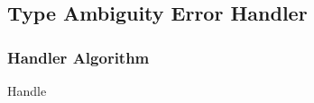 \documentclass[../../Algorithms.tex]{subfiles}
\begin{document}
    \subsection{Type Ambiguity Error Handler}

    \subsubsection{Handler Algorithm}

    \begin{algorithm}[H]
        \caption{Handle}

    \end{algorithm}
\end{document}

